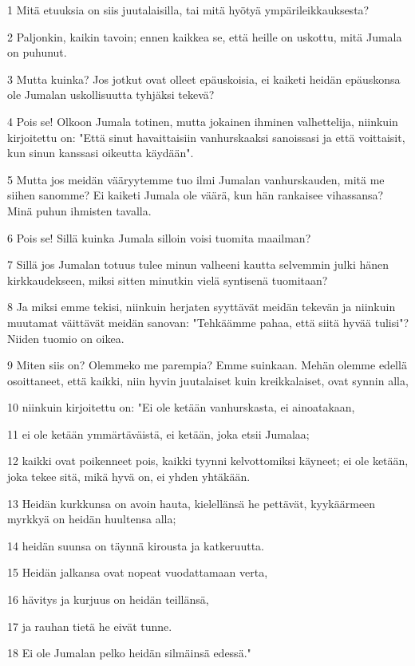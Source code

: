 \par 1 Mitä etuuksia on siis juutalaisilla, tai mitä hyötyä ympärileikkauksesta?
\par 2 Paljonkin, kaikin tavoin; ennen kaikkea se, että heille on uskottu, mitä Jumala on puhunut.
\par 3 Mutta kuinka? Jos jotkut ovat olleet epäuskoisia, ei kaiketi heidän epäuskonsa ole Jumalan uskollisuutta tyhjäksi tekevä?
\par 4 Pois se! Olkoon Jumala totinen, mutta jokainen ihminen valhettelija, niinkuin kirjoitettu on: "Että sinut havaittaisiin vanhurskaaksi sanoissasi ja että voittaisit, kun sinun kanssasi oikeutta käydään".
\par 5 Mutta jos meidän vääryytemme tuo ilmi Jumalan vanhurskauden, mitä me siihen sanomme? Ei kaiketi Jumala ole väärä, kun hän rankaisee vihassansa? Minä puhun ihmisten tavalla.
\par 6 Pois se! Sillä kuinka Jumala silloin voisi tuomita maailman?
\par 7 Sillä jos Jumalan totuus tulee minun valheeni kautta selvemmin julki hänen kirkkaudekseen, miksi sitten minutkin vielä syntisenä tuomitaan?
\par 8 Ja miksi emme tekisi, niinkuin herjaten syyttävät meidän tekevän ja niinkuin muutamat väittävät meidän sanovan: "Tehkäämme pahaa, että siitä hyvää tulisi"? Niiden tuomio on oikea.
\par 9 Miten siis on? Olemmeko me parempia? Emme suinkaan. Mehän olemme edellä osoittaneet, että kaikki, niin hyvin juutalaiset kuin kreikkalaiset, ovat synnin alla,
\par 10 niinkuin kirjoitettu on: "Ei ole ketään vanhurskasta, ei ainoatakaan,
\par 11 ei ole ketään ymmärtäväistä, ei ketään, joka etsii Jumalaa;
\par 12 kaikki ovat poikenneet pois, kaikki tyynni kelvottomiksi käyneet; ei ole ketään, joka tekee sitä, mikä hyvä on, ei yhden yhtäkään.
\par 13 Heidän kurkkunsa on avoin hauta, kielellänsä he pettävät, kyykäärmeen myrkkyä on heidän huultensa alla;
\par 14 heidän suunsa on täynnä kirousta ja katkeruutta.
\par 15 Heidän jalkansa ovat nopeat vuodattamaan verta,
\par 16 hävitys ja kurjuus on heidän teillänsä,
\par 17 ja rauhan tietä he eivät tunne.
\par 18 Ei ole Jumalan pelko heidän silmäinsä edessä."
